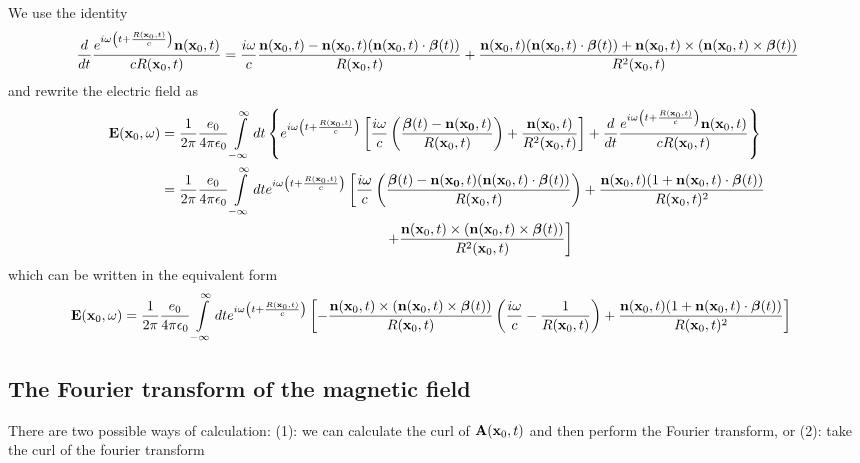 We use the identity
\begin{align}
    \frac{d}{dt}\frac{e^{i\omega\left(t+\frac{R({\bf x}_0,t)}c\right)}{\bf n}({\bf x}_0,t)}{cR({\bf x}_0,t)}=\frac{i\omega}c\frac{{\bf n}({\bf x}_0,t)-{\bf n}({\bf x}_0,t)({\bf n}({\bf x}_0,t)\cdot{\boldsymbol{\beta}}(t))}{R({\bf x}_0,t)}+\frac{{\bf n}({\bf x}_0,t)({\bf n}({\bf x}_0,t)\cdot{\boldsymbol{\beta}}(t))+{\bf n}({\bf x}_0,t)\times({\bf n}({\bf x}_0,t)\times{\boldsymbol{\beta}}(t))}{R^2({\bf x}_0,t)}
\end{align}
and rewrite the electric field as
\begin{align}
    {\bf E}({\bf x}_0,\omega) & =\frac1{2\pi}\frac{e_0}{4\pi\epsilon_0}\int\limits_{-\infty}^{\infty}dt\left\{e^{i\omega\left( t+\frac{R({\bf x}_0,t)}{c}\right)}\left[\frac{i\omega}c\left(\frac{{\boldsymbol{\beta}}(t)-{\bf n}({\bf x_0},t)}{R({\bf x}_0,t)}\right)+\frac{{\bf n}({\bf x}_0,t)}{R^2({\bf x}_0,t)}\right]+\frac{d}{dt}\frac{e^{i\omega\left(t+\frac{R({\bf x}_0,t)}c\right)}{\bf n}({\bf x}_0,t)}{cR({\bf x}_0,t)}\right\}\nonumber \\
                              & =\frac1{2\pi}\frac{e_0}{4\pi\epsilon_0}\int\limits_{-\infty}^{\infty}dte^{i\omega\left( t+\frac{R({\bf x}_0,t)}{c}\right)}\left[\frac{i\omega}c\left(\frac{{\boldsymbol{\beta}}(t)-{\bf n}({\bf x_0},t)({\bf n}({\bf x}_0,t)\cdot{\boldsymbol{\beta}}(t))}{R({\bf x}_0,t)}\right)+\frac{{\bf n}({\bf x}_0,t)(1+{\bf n}({\bf x}_0,t)\cdot{\boldsymbol{\beta}}(t))}{R({\bf x}_0,t)^2}\right.\nonumber                   \\
                              & \left. \qquad \qquad  \qquad \qquad  \qquad \qquad  \qquad \qquad +\frac{{\bf n}({\bf x}_0,t)\times({\bf n}({\bf x}_0,t)\times{\boldsymbol{\beta}}(t))}{R^2({\bf x}_0,t)}\right]
\end{align}
which can be written in the equivalent form
\begin{align}
    {\bf E}({\bf x}_0,\omega) & =\frac1{2\pi}\frac{e_0}{4\pi\epsilon_0}\int\limits_{-\infty}^{\infty}dte^{i\omega\left( t+\frac{R({\bf x}_0,t)}{c}\right)}\left[-\frac{{\bf n}({\bf x}_0,t)\times({\bf n}({\bf x}_0,t)\times{\boldsymbol{\beta}}(t))}{R({\bf x}_0,t)}\left(\frac{i\omega}c-\frac1{R({\bf x}_0,t)}\right)+\frac{{\bf n}({\bf x}_0,t)(1+{\bf n}({\bf x}_0,t)\cdot{\boldsymbol{\beta}}(t))}{R({\bf x}_0,t)^2}\right]
\end{align}

\subsection{The Fourier transform of the magnetic field}
There are two possible ways of calculation: (1): we can calculate the curl of ${\bf A}({\bf x}_0,t)$ and then perform the Fourier transform, or (2): take the curl of the fourier transform

